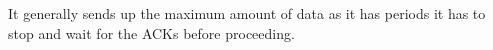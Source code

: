 It generally sends up the maximum amount of data as it has periods it has to stop and wait for the ACKs before proceeding.\\
